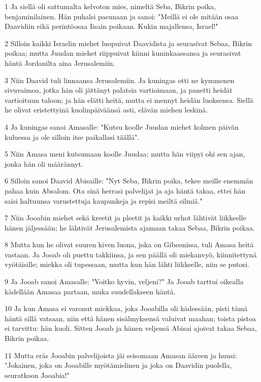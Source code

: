 \par 1 Ja siellä oli sattumalta kelvoton mies, nimeltä Seba, Bikrin poika, benjaminilainen. Hän puhalsi pasunaan ja sanoi: "Meillä ei ole mitään osaa Daavidiin eikä perintöosaa Iisain poikaan. Kukin majallensa, Israel!"
\par 2 Silloin kaikki Israelin miehet luopuivat Daavidista ja seurasivat Sebaa, Bikrin poikaa; mutta Juudan miehet riippuivat kiinni kuninkaassansa ja seurasivat häntä Jordanilta aina Jerusalemiin.
\par 3 Niin Daavid tuli linnaansa Jerusalemiin. Ja kuningas otti ne kymmenen sivuvaimoa, jotka hän oli jättänyt palatsia vartioimaan, ja panetti heidät vartioituun taloon; ja hän elätti heitä, mutta ei mennyt heidän luoksensa. Siellä he olivat eristettyinä kuolinpäiväänsä asti, elävän miehen leskinä.
\par 4 Ja kuningas sanoi Amasalle: "Kutsu koolle Juudan miehet kolmen päivän kuluessa ja ole silloin itse paikallasi täällä".
\par 5 Niin Amasa meni kutsumaan koolle Juudaa; mutta hän viipyi ohi sen ajan, jonka hän oli määrännyt.
\par 6 Silloin sanoi Daavid Abisaille: "Nyt Seba, Bikrin poika, tekee meille enemmän pahaa kuin Absalom. Ota sinä herrasi palvelijat ja aja häntä takaa, ettei hän saisi haltuunsa varustettuja kaupunkeja ja repisi meiltä silmiä."
\par 7 Niin Jooabin miehet sekä kreetit ja pleetit ja kaikki urhot lähtivät liikkeelle hänen jäljessään; he lähtivät Jerusalemista ajamaan takaa Sebaa, Bikrin poikaa.
\par 8 Mutta kun he olivat suuren kiven luona, joka on Gibeonissa, tuli Amasa heitä vastaan. Ja Jooab oli puettu takkiinsa, ja sen päällä oli miekanvyö, kiinnitettynä vyötäisille; miekka oli tupessaan, mutta kun hän lähti liikkeelle, niin se putosi.
\par 9 Ja Jooab sanoi Amasalle: "Voitko hyvin, veljeni?" Ja Jooab tarttui oikealla kädellään Amasaa partaan, muka suudellakseen häntä.
\par 10 Ja kun Amasa ei varonut miekkaa, joka Jooabilla oli kädessään, pisti tämä häntä sillä vatsaan, niin että hänen sisälmyksensä valuivat maahan; toista pistoa ei tarvittu: hän kuoli. Sitten Jooab ja hänen veljensä Abisai ajoivat takaa Sebaa, Bikrin poikaa.
\par 11 Mutta eräs Jooabin palvelijoista jäi seisomaan Amasan ääreen ja huusi: "Jokainen, joka on Jooabille myötämielinen ja joka on Daavidin puolella, seuratkoon Jooabia!"
